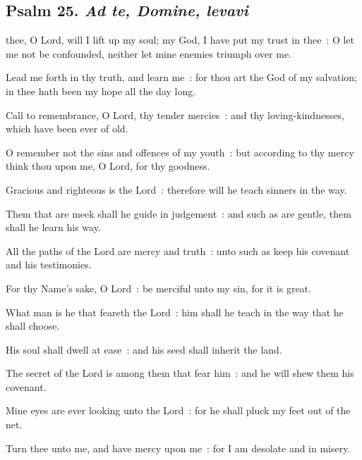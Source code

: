 \clearpage
\subsection{Psalm 25. \textit{Ad te, Domine, levavi}}


 thee, O Lord, will I lift up my soul; my God, I have put my trust in thee~: O let me not be confounded, neither let mine enemies triumph over me.\par
{}
Lead me forth in thy truth, and learn me~: for thou art the God of my salvation; in thee hath been my hope all the day long.\par
{}Call to remembrance, O Lord, thy tender mercies~: and thy loving-kindnesses, which have been ever of old.\par
{}O remember not the sins and offences of my youth~: but according to thy mercy think thou upon me, O Lord, for thy goodness.\par
{}Gracious and righteous is the Lord~: therefore will he teach sinners in the way.\par
{}Them that are meek shall he guide in judgement~: and such as are gentle, them shall he learn his way.\par
{}All the paths of the Lord are mercy and truth~: unto such as keep his covenant and his testimonies.\par
{}For thy Name's sake, O Lord~: be merciful unto my sin, for it is great.\par
{}What man is he that feareth the Lord~: him shall he teach in the way that he shall choose.\par
{}His soul shall dwell at ease~: and his seed shall inherit the land.\par
{}The secret of the Lord is among them that fear him~: and he will shew them his covenant.\par
{}Mine eyes are ever looking unto the Lord~: for he shall pluck my feet out of the net.\par
{}Turn thee unto me, and have mercy upon me~: for I am desolate and in misery.\par
